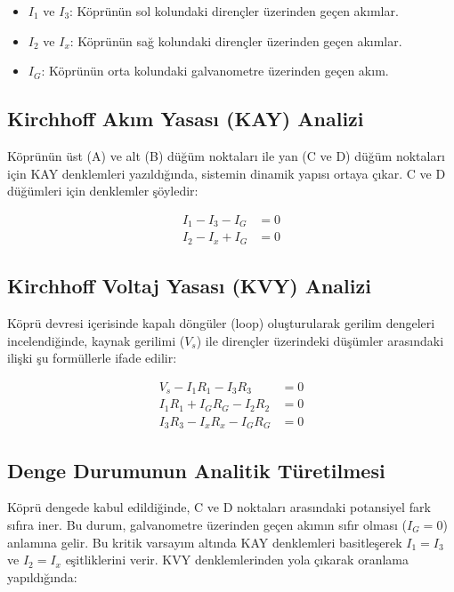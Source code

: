 \documentclass[12pt,a4paper]{article}
\begin{document}
\begin{itemize}
    \item $I_1$ ve $I_3$: Köprünün sol kolundaki dirençler üzerinden geçen akımlar.
    \item $I_2$ ve $I_x$: Köprünün sağ kolundaki dirençler üzerinden geçen akımlar.
    \item $I_G$: Köprünün orta kolundaki galvanometre üzerinden geçen akım.
\end{itemize}

\subsection{Kirchhoff Akım Yasası (KAY) Analizi}
Köprünün üst (A) ve alt (B) düğüm noktaları ile yan (C ve D) düğüm noktaları için KAY denklemleri yazıldığında, sistemin dinamik yapısı ortaya çıkar. C ve D düğümleri için denklemler şöyledir:

\begin{align}
    I_1 - I_3 - I_G &= 0 \\
    I_2 - I_x + I_G &= 0
\end{align}

\subsection{Kirchhoff Voltaj Yasası (KVY) Analizi}
Köprü devresi içerisinde kapalı döngüler (loop) oluşturularak gerilim dengeleri incelendiğinde, kaynak gerilimi ($V_s$) ile dirençler üzerindeki düşümler arasındaki ilişki şu formüllerle ifade edilir:

\begin{align}
    V_s - I_1 R_1 - I_3 R_3 &= 0 \\
    I_1 R_1 + I_G R_G - I_2 R_2 &= 0 \\
    I_3 R_3 - I_x R_x - I_G R_G &= 0
\end{align}



\subsection{Denge Durumunun Analitik Türetilmesi}
Köprü dengede kabul edildiğinde, C ve D noktaları arasındaki potansiyel fark sıfıra iner. Bu durum, galvanometre üzerinden geçen akımın sıfır olması ($I_G = 0$) anlamına gelir. Bu kritik varsayım altında KAY denklemleri basitleşerek $I_1 = I_3$ ve $I_2 = I_x$ eşitliklerini verir. KVY denklemlerinden yola çıkarak oranlama yapıldığında:
\end{document}
